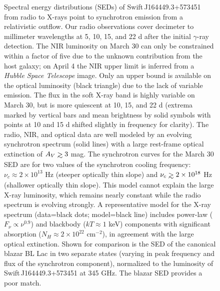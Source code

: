 \clearpage
\begin{figure}
\centerline{}
\caption[]{\small 
Spectral energy distributions (SEDs) of
Swift\,J164449.3+573451 from radio to X-rays point to synchrotron
emission from a relativistic outflow.  Our radio observations cover
decimeter to millimeter wavelengths at 5, 10, 15, and 22 d after the
initial $\gamma$-ray detection.  The NIR luminosity on March 30
can only be constrained within a factor of five due to the
unknown contribution from the host galaxy; on April 4 the NIR
upper limit is inferred from a {\it Hubble Space Telescope}
image\cite{ltc+11}.  Only an upper bound is available on the optical 
luminosity (black triangle) due to the lack\cite{ltc+11} of variable 
emission.  The flux in the soft X-ray band is highly variable on March
30, but is more quiescent at 10, 15, and 22 d (extrema marked by vertical 
bars and mean brightness by solid symbols with points at 10 and 15 d shifted slightly 
in frequency for clarity).  The radio, NIR, and optical data are well 
modeled by an evolving synchrotron spectrum (solid lines) with 
a large rest-frame optical extinction of $A_V\simgt 3$ mag.  The synchrotron 
curves for the March 30 SED are for two values of the synchrotron cooling frequency: $\nu_c\approx
2\times 10^{13}$ Hz (steeper optically thin slope) and $\nu_c\simgt
2\times 10^{18}$ Hz (shallower optically thin slope).  This 
model cannot explain the large X-ray luminosity, which remains
nearly constant while the radio spectrum is evolving strongly.  A
representative model for the X-ray spectrum (data=black dots;
model=black line) includes power-law ($F_\nu\propto\nu^{0.9}$) and
blackbody ($kT\approx 1$ keV) components with significant absorption
($N_H\approx 2\times 10^{22}$ cm$^{-2}$), in agreement with the
large optical extinction.  Shown for comparison is the SED of the
canonical blazar BL Lac in two separate states (varying in peak
frequency and flux of the synchrotron component), normalized to the
luminosity of Swift\,J164449.3+573451 at 345 GHz.  The blazar SED
provides a poor match.
}
\label{fig:sed} 
\end{figure}


